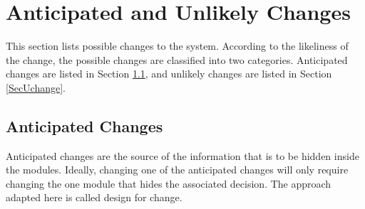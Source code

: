 \documentclass[12pt, titlepage]{article}
\begin{document}
\section{Anticipated and Unlikely Changes} \label{SecChange}

This section lists possible changes to the system. According to the likeliness
of the change, the possible changes are classified into two
categories. Anticipated changes are listed in Section \ref{SecAchange}, and
unlikely changes are listed in Section \ref{SecUchange}.

\subsection{Anticipated Changes} \label{SecAchange}

Anticipated changes are the source of the information that is to be hidden
inside the modules. Ideally, changing one of the anticipated changes will only
require changing the one module that hides the associated decision. The approach
adapted here is called design for
change.
\end{document}
